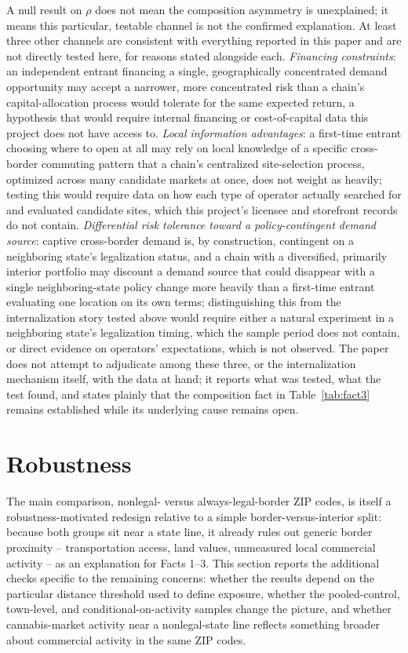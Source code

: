 \documentclass[english,12pt]{article}
\begin{document}
A null result on $\rho$ does not mean the composition asymmetry is unexplained; it means this particular, testable channel is not the confirmed explanation. At least three other channels are consistent with everything reported in this paper and are not directly tested here, for reasons stated alongside each. \emph{Financing constraints}: an independent entrant financing a single, geographically concentrated demand opportunity may accept a narrower, more concentrated risk than a chain's capital-allocation process would tolerate for the same expected return, a hypothesis that would require internal financing or cost-of-capital data this project does not have access to. \emph{Local information advantages}: a first-time entrant choosing where to open at all may rely on local knowledge of a specific cross-border commuting pattern that a chain's centralized site-selection process, optimized across many candidate markets at once, does not weight as heavily; testing this would require data on how each type of operator actually searched for and evaluated candidate sites, which this project's licensee and storefront records do not contain. \emph{Differential risk tolerance toward a policy-contingent demand source}: captive cross-border demand is, by construction, contingent on a neighboring state's legalization status, and a chain with a diversified, primarily interior portfolio may discount a demand source that could disappear with a single neighboring-state policy change more heavily than a first-time entrant evaluating one location on its own terms; distinguishing this from the internalization story tested above would require either a natural experiment in a neighboring state's legalization timing, which the sample period does not contain, or direct evidence on operators' expectations, which is not observed. The paper does not attempt to adjudicate among these three, or the internalization mechanism itself, with the data at hand; it reports what was tested, what the test found, and states plainly that the composition fact in Table~\ref{tab:fact3} remains established while its underlying cause remains open.

\FloatBarrier

\section{Robustness}
\label{sec:falsification}

The main comparison, nonlegal- versus always-legal-border ZIP codes, is itself a robustness-motivated redesign relative to a simple border-versus-interior split: because both groups sit near a state line, it already rules out generic border proximity -- transportation access, land values, unmeasured local commercial activity -- as an explanation for Facts 1--3. This section reports the additional checks specific to the remaining concerns: whether the results depend on the particular distance threshold used to define exposure, whether the pooled-control, town-level, and conditional-on-activity samples change the picture, and whether cannabis-market activity near a nonlegal-state line reflects something broader about commercial activity in the same ZIP codes.
\end{document}
